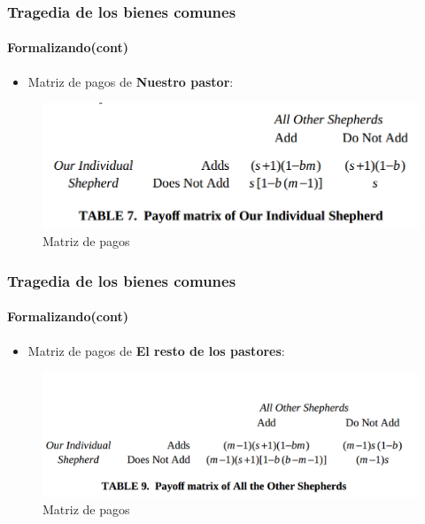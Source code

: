 \documentclass{beamer}
\begin{document}
\begin{frame}
  \frametitle{Tragedia de los bienes comunes}
  \framesubtitle{Formalizando(cont)}
    \begin{itemize}
      \item Matriz de pagos de \textbf{Nuestro pastor}:
    \end{itemize}
    \begin{figure}[h!]
      \centering        
      \includegraphics[scale=0.30]{fig/pagos-generico-mipastor.png}
      \caption{Matriz de pagos}
  \end{figure}
\end{frame}

\begin{frame}
  \frametitle{Tragedia de los bienes comunes}
  \framesubtitle{Formalizando(cont)}
    \begin{itemize}
      \item Matriz de pagos de \textbf{El resto de los pastores}:
    \end{itemize}
    \begin{figure}[h!]
      \centering        
      \includegraphics[scale=0.30]{fig/pagos-generico-restopastores.png}      
      \caption{Matriz de pagos}
  \end{figure}
\end{frame}
\end{document}
